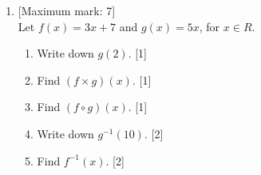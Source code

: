 \documentclass[12pt, twoside]{article}
\begin{document}
\begin{enumerate}
\newpage 
    \item {[Maximum mark: 7]} \\[0.3cm]
    Let $f(x)=3x+7$ and $g(x)=5x$, for $x \in R$.
        \begin{enumerate}
            \item Write down $g(2)$. \hfill [1]
            \item Find $(f \times g)(x)$. \hfill [1]
            \item Find $(f \circ g)(x)$. \hfill [1]
            \item Write down $g^{-1}(10)$. \hfill [2]
            \item Find $f^{-1}(x)$. \hfill [2]
        \end{enumerate}


\end{enumerate}
\end{document}

